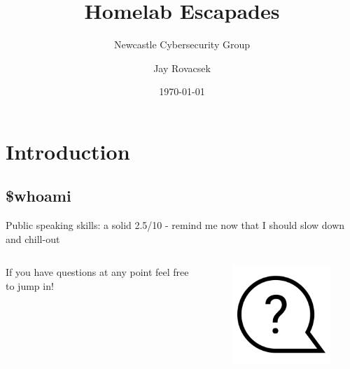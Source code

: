 \documentclass{beamer}
\title[Or how my wife learnt about my ability to wreck a home network]{Homelab Escapades}
\subtitle{Newcastle Cybersecurity Group}
\author[Jay Rovacsek]{Jay Rovacsek}
\date{\today}
\begin{document}
\begin{frame}
\maketitle
\end{frame}

\section{Introduction}
\subsection{\$whoami}

\begin{frame}
    Public speaking skills: a solid 2.5/10 - remind me now that I should slow down and chill-out
\end{frame}

\begin{frame}
    \begin{columns}
        \begin{column}{0.5\textwidth}
            If you have questions at any point feel free to jump in! 
        \end{column}
        \begin{column}{0.5\textwidth}
            \begin{figure}
                \centering
                \includegraphics[width=1\textwidth,keepaspectratio]{../resources/question.png}
            \end{figure}
        \end{column}
    \end{columns}
\end{frame}
\end{document}
